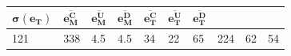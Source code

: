 \begin{xltabular}{\linewidth}[b!]{@{}llllllllll@{}}
\begin{minipage}[b]{0.09\columnwidth}
\(\bm{\sigma(e_T)}\)\strut
\end{minipage} & \begin{minipage}[b]{0.05\columnwidth}\raggedright
\(\bm{\overline{e_M^C}}\)\strut
\end{minipage} & \begin{minipage}[b]{0.05\columnwidth}\raggedright
\(\bm{\overline{e_M^U}}\)\strut
\end{minipage} & \begin{minipage}[b]{0.05\columnwidth}\raggedright
\(\bm{\overline{e_M^D}}\)\strut
\end{minipage} & \begin{minipage}[b]{0.05\columnwidth}\raggedright
\(\bm{\overline{e_T^C}}\)\strut
\end{minipage} & \begin{minipage}[b]{0.05\columnwidth}\raggedright
\(\bm{\overline{e_T^U}}\)\strut
\end{minipage} & \begin{minipage}[b]{0.05\columnwidth}\raggedright
\(\bm{\overline{e_T^D}}\)\strut
\end{minipage}\tabularnewline
\midrule
\endhead
\begin{minipage}[t]{0.05\columnwidth}\raggedright
121\strut
\end{minipage} & \begin{minipage}[t]{0.05\columnwidth}\raggedright
338\strut
\end{minipage} & \begin{minipage}[t]{0.09\columnwidth}\raggedright
4.5\strut
\end{minipage} & \begin{minipage}[t]{0.09\columnwidth}\raggedright
4.5\strut
\end{minipage} & \begin{minipage}[t]{0.05\columnwidth}\raggedright
34\strut
\end{minipage} & \begin{minipage}[t]{0.05\columnwidth}\raggedright
22\strut
\end{minipage} & \begin{minipage}[t]{0.05\columnwidth}\raggedright
65\strut
\end{minipage} & \begin{minipage}[t]{0.05\columnwidth}\raggedright
224\strut
\end{minipage} & \begin{minipage}[t]{0.05\columnwidth}\raggedright
62\strut
\end{minipage} & \begin{minipage}[t]{0.05\columnwidth}\raggedright
54\strut
\end{minipage}\tabularnewline
\bottomrule
\end{xltabular}

